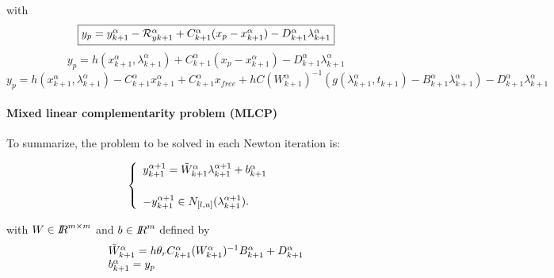 with 
\begin{equation}
\fbox{$y_p = y^{\alpha}_{k+1} -\mathcal R^{\alpha}_{yk+1} + C^{\alpha}_{k+1}(x_p -x^{\alpha}_{k+1}) -
D^{\alpha}_{k+1} \lambda^{\alpha}_{k+1} $}
\end{equation}
\begin{equation}
y_p = h(x^{\alpha}_{k+1},\lambda^{\alpha}_{k+1}) + C^{\alpha}_{k+1}(x_p -x^{\alpha}_{k+1}) -
D^{\alpha}_{k+1} \lambda^{\alpha}_{k+1} 
\end{equation}
\begin{equation}
y_p = h(x^{\alpha}_{k+1},\lambda^{\alpha}_{k+1}) - C^{\alpha}_{k+1}x^{\alpha}_{k+1}
+C^{\alpha}_{k+1} x_{free} +hC(W^{\alpha}_{k+1})^{-1}(g(\lambda
^{\alpha}_{k+1},t_{k+1})-B^{\alpha}_{k+1} \lambda^{\alpha}_{k+1}) -
D^{\alpha}_{k+1} \lambda^{\alpha}_{k+1} 
\end{equation}

\paragraph{Mixed linear complementarity problem (MLCP)}To summarize, the problem to be solved in each Newton iteration is:\\{
  \begin{minipage}[l]{1.0\linewidth}
    \begin{equation}
      \begin{cases}
      \begin{array}[l]{l}
        y^{\alpha+1}_{k+1} =   \tilde W^{\alpha}_{k+1}  \lambda^{\alpha+1}_{k+1} + b^{\alpha}_{k+1}
        \\ \\
        -y^{\alpha+1}_{k+1} \in N_{[l,u]}(\lambda^{\alpha+1}_{k+1} ). 
      \end{array}
      \label{eq:NL214}
      \end{cases}
    \end{equation}
  \end{minipage}
}
with $W\in \mbox{\rm $I\!\!R$}^{m\times m}$ and $b\in\mbox{\rm $I\!\!R$}^{m}$ defined by
\begin{equation}
  \label{eq:NL215}
 \begin{array}[l]{l}
   \tilde W^{\alpha}_{k+1} = h \theta _r C^{\alpha}_{k+1} (W^{\alpha}_{k+1})^{-1}  B^{\alpha}_{k+1} + D^{\alpha}_{k+1} \\
   b^{\alpha}_{k+1} = y_p
\end{array}
\end{equation}

